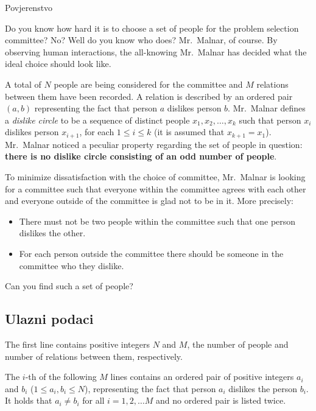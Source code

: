 \begin{statement}[
  problempoints=100,
  timelimit=3 sekunde,
  memorylimit=512 MiB,
]{Povjerenstvo}

Do you know how hard it is to choose a set of people for the problem selection 
committee? No? Well do you know who does? Mr.\ Malnar, of course. By observing 
human interactions, the all-knowing Mr.\ Malnar has decided what the ideal 
choice should look like.

A total of $N$ people are being considered for the committee and $M$ relations 
between them have been recorded. A relation is described by an ordered pair 
$(a, b)$ representing the fact that person $a$ dislikes person $b$.  Mr.\ Malnar 
defines a \textit{dislike circle} to be a sequence of distinct people $x_1, x_2, \dots, x_k$
such that person $x_i$ dislikes person $x_{i+1}$, for each $1 \leq i \leq k$ 
(it is assumed that $x_{k+1} = x_1$). Mr.\ Malnar noticed a peculiar property 
regarding the set of people in question: \textbf{there is no dislike circle consisting 
of an odd number of people}.

To minimize dissatisfaction with the choice of committee, Mr.\ Malnar is looking for a 
committee such that everyone within the committee agrees with each other and everyone 
outside of the committee is glad not to be in it. More precisely:
\begin{itemize}
    \item There must not be two people within the committee such that one person dislikes the other.
    \item For each person outside the committee there should be someone in the committee who they dislike.
\end{itemize}

Can you find such a set of people?

\subsection*{Ulazni podaci}

The first line contains positive integers $N$ and $M$, the number of people and number
of relations between them, respectively.

The $i$-th of the following $M$ lines contains an ordered pair of positive 
integers $a_i$ and $b_i$ ($1 \leq a_i, b_i \leq N$), representing the fact 
that person $a_i$ dislikes the person $b_i$. It holds that $a_i \ne b_i$ for 
all $i = 1, 2, \dots M$ and no ordered pair is listed twice.


\end{statement}
